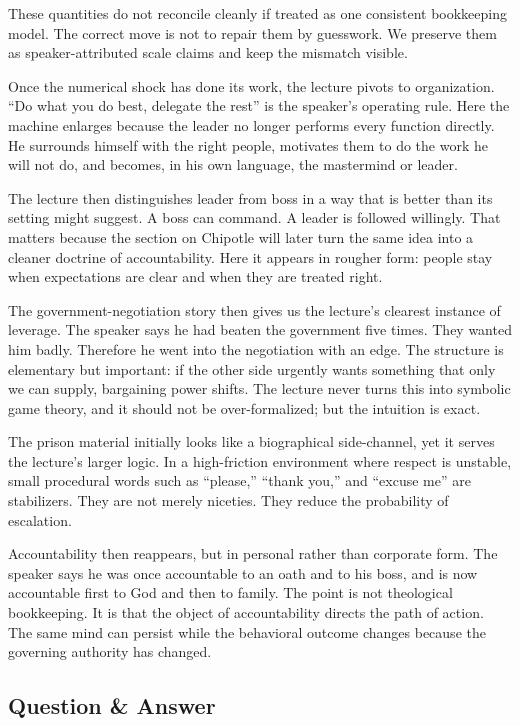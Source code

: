 \begin{remark}
These quantities do not reconcile cleanly if treated as one consistent bookkeeping model. The correct move is not to repair them by guesswork. We preserve them as speaker-attributed scale claims and keep the mismatch visible.
\end{remark}

Once the numerical shock has done its work, the lecture pivots to organization. ``Do what you do best, delegate the rest'' is the speaker's operating rule. Here the machine enlarges because the leader no longer performs every function directly. He surrounds himself with the right people, motivates them to do the work he will not do, and becomes, in his own language, the mastermind or leader.

The lecture then distinguishes leader from boss in a way that is better than its setting might suggest. A boss can command. A leader is followed willingly. That matters because the section on Chipotle will later turn the same idea into a cleaner doctrine of accountability. Here it appears in rougher form: people stay when expectations are clear and when they are treated right.

The government-negotiation story then gives us the lecture's clearest instance of leverage. The speaker says he had beaten the government five times. They wanted him badly. Therefore he went into the negotiation with an edge. The structure is elementary but important: if the other side urgently wants something that only we can supply, bargaining power shifts. The lecture never turns this into symbolic game theory, and it should not be over-formalized; but the intuition is exact.

The prison material initially looks like a biographical side-channel, yet it serves the lecture's larger logic. In a high-friction environment where respect is unstable, small procedural words such as ``please,'' ``thank you,'' and ``excuse me'' are stabilizers. They are not merely niceties. They reduce the probability of escalation.

Accountability then reappears, but in personal rather than corporate form. The speaker says he was once accountable to an oath and to his boss, and is now accountable first to God and then to family. The point is not theological bookkeeping. It is that the object of accountability directs the path of action. The same mind can persist while the behavioral outcome changes because the governing authority has changed.

\subsection{Question \& Answer}

